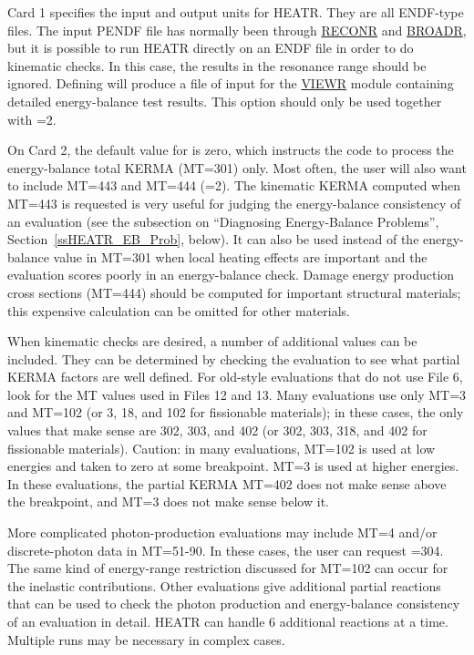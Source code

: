 Card 1 specifies the input and output units for HEATR.  They
are all ENDF-type files.  The input PENDF file has normally
been through \hyperlink{sRECONRhy}{RECONR} and
\hyperlink{sBROADRhy}{BROADR}, but it is possible to run HEATR
directly on an ENDF file in order to do kinematic checks.  In
this case, the results in the resonance range should be
ignored. Defining  will produce a file of input
for the \hyperlink{sVIEWRhy}{VIEWR} module
containing detailed energy-balance
test results.  This option should only be used together with
=2.

On Card 2, the default value for  is zero, which
instructs the code to process the energy-balance total KERMA
(MT=301) only.  Most often, the user will also want to include MT=443
and MT=444 (=2).  The kinematic KERMA computed
when MT=443 is requested is very useful for judging the
energy-balance consistency
of an evaluation (see the subsection on ``Diagnosing
Energy-Balance Problems'', Section~\ref{ssHEATR_EB_Prob},
below).  It can also be used instead
of the energy-balance value in MT=301 when local heating effects
are important and the evaluation scores poorly in an energy-balance
check.  Damage energy production cross sections (MT=444) should be
computed for important structural materials; this expensive
calculation can be omitted for other materials.

When kinematic checks are desired, a number of additional
 values can be included.  They can be determined by
checking the evaluation to see what partial KERMA factors are
well defined.  For old-style evaluations that do not use File 6,
look for the MT values used in Files 12 and 13.  Many
evaluations use only MT=3 and MT=102 (or 3, 18, and 102 for
fissionable materials); in these cases, the only 
values that make sense are 302, 303, and 402 (or 302, 303, 318,
and 402 for fissionable materials).  Caution: in many evaluations,
MT=102 is used at low energies and taken to zero at some
breakpoint.  MT=3 is used at higher energies.  In these
evaluations, the partial KERMA MT=402 does not make sense above
the breakpoint, and MT=3 does not make sense below it.

More complicated photon-production evaluations may include MT=4
and/or discrete-photon data in MT=51-90.  In these cases, the
user can request =304.  The same kind of energy-range
restriction discussed for MT=102 can occur for the inelastic
contributions.  Other evaluations give additional partial
reactions that can be used to check the photon production and
energy-balance consistency of an evaluation in detail.  HEATR
can handle 6 additional reactions at a time.  Multiple runs
may be necessary in complex cases.

